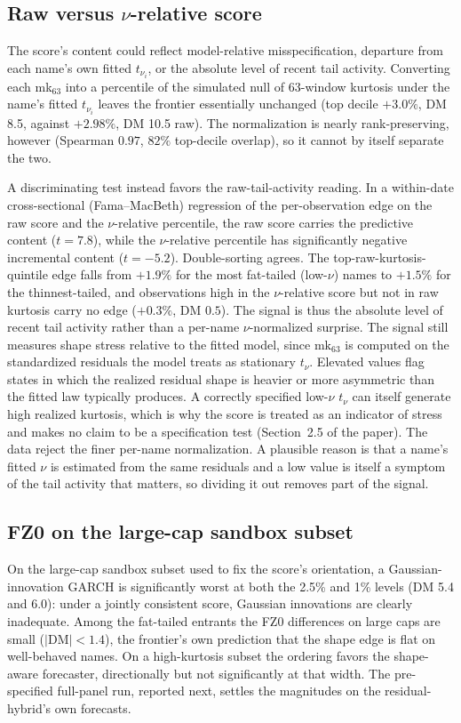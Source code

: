 \documentclass[11pt]{article}
\begin{document}
\subsection*{Raw versus $\nu$-relative score}
The score's content could reflect model-relative
misspecification, departure from each name's own fitted $t_{\nu_i}$, or
the absolute level of recent tail activity. Converting each
mk$_{63}$ into a percentile of the simulated null of 63-window kurtosis
under the name's fitted $t_{\nu_i}$ leaves the frontier essentially
unchanged (top decile $+3.0\%$, DM 8.5, against $+2.98\%$, DM 10.5 raw).
The normalization is nearly rank-preserving, however (Spearman $0.97$, $82\%$
top-decile overlap), so it cannot by itself separate the two.

A discriminating test instead favors the raw-tail-activity reading.
In a within-date cross-sectional (Fama--MacBeth) regression of the
per-observation edge on the raw score and the $\nu$-relative percentile,
the raw score carries the predictive content ($t=7.8$), while the $\nu$-relative percentile has significantly negative incremental content ($t=-5.2$). Double-sorting agrees. The top-raw-kurtosis-quintile edge falls from $+1.9\%$ for the most fat-tailed (low-$\nu$) names to $+1.5\%$ for the thinnest-tailed, and observations high in the $\nu$-relative score but not in raw kurtosis carry no edge ($+0.3\%$, DM $0.5$). The signal is thus the absolute level of recent tail activity rather than
a per-name $\nu$-normalized surprise. The signal still measures shape
stress relative to the fitted model, since $\mathrm{mk}_{63}$ is computed on the
standardized residuals the model treats as stationary $t_\nu$.
Elevated values flag states in which the realized residual shape is
heavier or more asymmetric than the fitted law typically produces. A correctly specified low-$\nu$ $t_\nu$ can itself generate high realized kurtosis, which is why the score is treated as an indicator of stress and makes no claim to be a specification test (Section~2.5 of the paper). The data reject the finer per-name normalization. A plausible reason is that a name's fitted $\nu$ is estimated from the same residuals and a low value is itself a symptom of the tail activity that matters, so dividing it out removes part of the signal.

\subsection*{FZ0 on the large-cap sandbox subset}
On the
large-cap sandbox subset used to fix the score's orientation, a
Gaussian-innovation GARCH is significantly worst at both the 2.5\% and 1\%
levels (DM 5.4 and 6.0): under a jointly consistent score, Gaussian innovations
are clearly inadequate. Among the fat-tailed entrants the FZ0 differences on
large caps are small ($|$DM$|<1.4$), the frontier's own prediction that the
shape edge is flat on well-behaved names. On a high-kurtosis subset the ordering favors the shape-aware forecaster, directionally but not significantly at that width. The pre-specified full-panel run, reported next, settles the magnitudes on the residual-hybrid's own forecasts.
\end{document}
